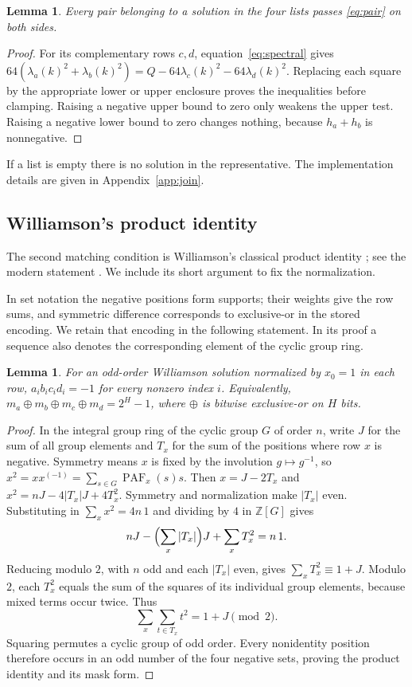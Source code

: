 \documentclass[11pt]{article}
\newtheorem{lemma}[theorem]{Lemma}
\newcommand{\PAF}{\operatorname{PAF}}
\newcommand{\Z}{\mathbb Z}
\begin{document}
\begin{lemma}\label{lem:pair}
Every pair belonging to a solution in the four lists passes
\eqref{eq:pair} on both sides.
\end{lemma}
\begin{proof}
For its complementary rows $c,d$, equation~\eqref{eq:spectral} gives
$64(\lambda_a(k)^2+\lambda_b(k)^2)=Q-64\lambda_c(k)^2-64\lambda_d(k)^2$.
Replacing each square by the appropriate lower or upper enclosure proves
the inequalities before clamping. Raising a negative upper bound to zero
only weakens the upper test. Raising a negative lower bound to zero changes
nothing, because $h_a+h_b$ is nonnegative.
\end{proof}
If a list is empty there is no solution in the representative. The implementation details are given in Appendix~\ref{app:join}.

\subsection{Williamson's product identity}
The second matching condition is Williamson's classical product identity
\cite{Williamson}; see the modern statement \cite[Theorem~14]{BKG}. We include its short argument to fix the normalization.

In set notation the negative positions form supports; their weights give
the row sums, and symmetric difference corresponds to exclusive-or in
the stored encoding. We retain that encoding in the following statement.
In its proof a sequence also denotes the corresponding element of the
cyclic group ring.
\begin{lemma}\label{lem:product}
For an odd-order Williamson solution normalized by $x_0=1$ in each row,
$a_i b_i c_i d_i=-1$ for every nonzero index $i$. Equivalently,
$m_a\mathbin{\oplus}m_b\mathbin{\oplus}m_c\mathbin{\oplus}m_d=2^H-1$,
where $\oplus$ is bitwise exclusive-or on $H$ bits.
\end{lemma}
\begin{proof}
In the integral group ring of the cyclic group $G$ of order $n$, write
$J$ for the sum of all group elements and $T_x$ for the sum of the
positions where row $x$ is negative. Symmetry means $x$ is fixed by the
involution $g\mapsto g^{-1}$, so
$x^2=x x^{(-1)}=\sum_{s\in G}\PAF_x(s)s$.
Then $x=J-2T_x$ and
$x^2=nJ-4|T_x|J+4T_x^2$. Symmetry and normalization make $|T_x|$ even.
Substituting in $\sum_x x^2=4n\,1$ and dividing by $4$ in $\Z[G]$ gives
\[
 nJ-\Bigl(\sum_x|T_x|\Bigr)J+\sum_xT_x^2=n\,1.
\]
Reducing modulo $2$, with $n$ odd and each $|T_x|$ even, gives
$\sum_xT_x^2\equiv1+J$. Modulo $2$, each $T_x^2$ equals the sum of the
squares of its individual group elements, because mixed terms occur twice.
Thus
\[
 \sum_x\sum_{t\in T_x}t^2=1+J\pmod2.
\]
Squaring permutes a cyclic group of odd order. Every nonidentity position
therefore occurs in an odd number of the four negative sets, proving the
product identity and its mask form.
\end{proof}
\end{document}
